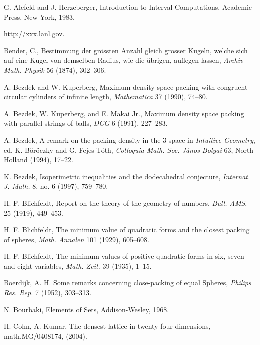 


\begin{thebibliography}{CHMS94}


 G. Alefeld and J. Herzeberger, Introduction
    to Interval Computations, Academic Press, New York, 1983.

 http://xxx.lanl.gov.

  Bender, C., Bestimmung der gr\"ossten Anzahl gleich
grosser Kugeln, welche sich auf eine Kugel von demselben Radius,
wie die \"ubrigen, auflegen lassen, {\it Archiv Math. Physik} 56
(1874), 302--306.

 A. Bezdek and W. Kuperberg, Maximum density space packing with
    congruent circular cylinders of infinite length,
    {\it Mathematica} 37 (1990), 74--80.

 A. Bezdek, W. Kuperberg, and E. Makai Jr., Maximum density
    space packing with parallel strings of balls,
    {\it DCG} 6 (1991), 227--283.

 A. Bezdek, A remark on the packing density in the 3-space
    in {\it Intuitive Geometry}, ed. K. B\"or\"oczky and G. Fejes
    T\'oth, {\it Colloquia Math. Soc. J\'anos Bolyai} 63, North-Holland
    (1994), 17--22.

 K. Bezdek, Isoperimetric inequalities and the dodecahedral
    conjecture, {\it Internat. J. Math.} 8, no. 6 (1997), 759--780.

 H. F. Blichfeldt,
    Report on the theory of the geometry of numbers,
    {\it Bull. AMS}, 25 (1919), 449--453.

 H. F. Blichfeldt,
    The minimum value of quadratic forms and the closest
    packing of spheres, {\it Math. Annalen} 101 (1929), 605--608.

 H. F. Blichfeldt,
    The minimum values of positive quadratic forms in six,
    seven and eight variables, {\it Math. Zeit.} 39 (1935), 1--15.

 Boerdijk, A. H. Some remarks concerning close-packing
of equal Spheres, {\it Philips Res. Rep.} 7 (1952), 303--313.

 N. Bourbaki, Elements of Sets, Addison-Wesley, 1968.

 H. Cohn, A. Kumar, The densest lattice in twenty-four
dimensions, math.MG/0408174, (2004).


\end{thebibliography}
